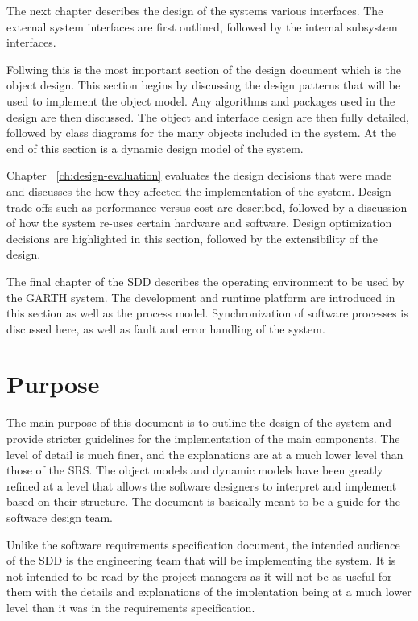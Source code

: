 \documentclass{report}
\begin{document}
The next chapter describes the design of the systems various interfaces. The
external system interfaces are first outlined, followed by the internal subsystem
interfaces.

Follwing this is the most important section of the design document which is the
object design. This section begins by discussing the design patterns that will be
used to implement the object model. Any algorithms and packages used in the
design are then discussed. The object and interface design are then fully 
detailed, followed by class diagrams for the many objects included in the system.
At the end of this section is a dynamic design model of the system.

Chapter ~\ref{ch:design-evaluation} evaluates the design decisions that were
made and discusses the how they affected the implementation of the system.
Design trade-offs such as performance versus cost are described, followed by a
discussion of how the system re-uses certain hardware and software. Design
optimization decisions are highlighted in this section, followed by the
extensibility of the design.

The final chapter of the SDD describes the operating environment to be used
by the GARTH system. The development and runtime platform are introduced in
this section as well as the process model. Synchronization of software processes
is discussed here, as well as fault and error handling of the system.

\section{Purpose}

The main purpose of this document is to outline the design of the system and
provide stricter guidelines for the implementation of the main components. The
level of detail is much finer, and the explanations are at a much lower level
than those of the SRS. The object models and dynamic models have been greatly
refined at a level that allows the software designers to interpret and implement
based on their structure. The document is basically meant to be a guide for the
software design team.

Unlike the software requirements specification document, the intended audience
of the SDD is the engineering team that will be implementing the system. It is
not intended to be read by the project managers as it will not be as useful for
them with the details and explanations of the implentation being at a much lower
level than it was in the requirements specification.
\end{document}
